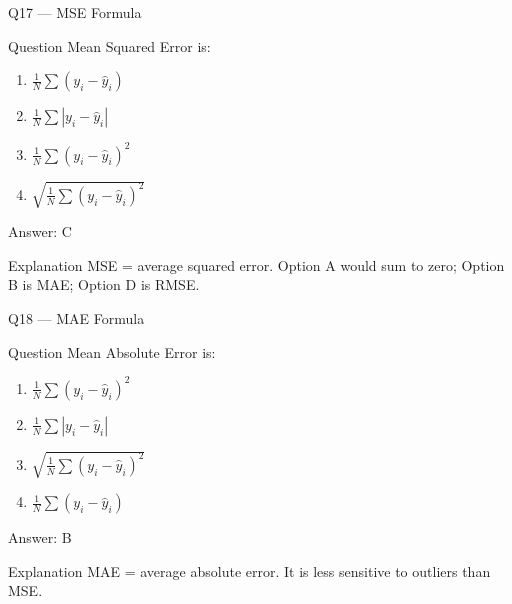 \documentclass[aspectratio=169,8pt]{beamer}
\begin{document}
	\begin{frame}{Q17 --- MSE Formula}
		\begin{block}{Question}
			Mean Squared Error is:
			\begin{enumerate}
				\item $\frac{1}{N}\sum (y_i - \hat{y}_i)$
				\item $\frac{1}{N}\sum |y_i - \hat{y}_i|$
				\item $\frac{1}{N}\sum (y_i - \hat{y}_i)^2$
				\item $\sqrt{\frac{1}{N}\sum (y_i - \hat{y}_i)^2}$
			\end{enumerate}
		\end{block}
		\begin{exampleblock}{Answer: C}\end{exampleblock}
		\begin{block}{Explanation}
			MSE = average squared error. Option A would sum to zero; Option B is MAE; Option D is RMSE.
		\end{block}
	\end{frame}
	
	\begin{frame}{Q18 --- MAE Formula}
		\begin{block}{Question}
			Mean Absolute Error is:
			\begin{enumerate}
				\item $\frac{1}{N}\sum (y_i - \hat{y}_i)^2$
				\item $\frac{1}{N}\sum |y_i - \hat{y}_i|$
				\item $\sqrt{\frac{1}{N}\sum (y_i - \hat{y}_i)^2}$
				\item $\frac{1}{N}\sum (y_i - \hat{y}_i)$
			\end{enumerate}
		\end{block}
		\begin{exampleblock}{Answer: B}\end{exampleblock}
		\begin{block}{Explanation}
			MAE = average absolute error. It is less sensitive to outliers than MSE.
		\end{block}
	\end{frame}
	
\end{document}
